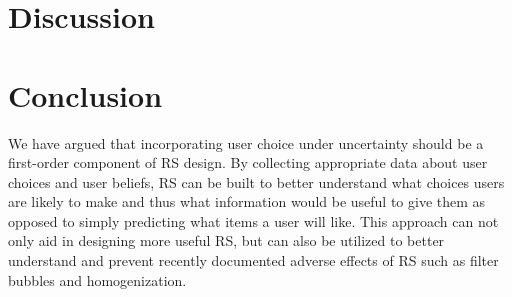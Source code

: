 \documentclass[sigconf]{acmart}
\begin{document}
\section{Discussion}

\section{Conclusion}

We have argued that incorporating user choice under uncertainty should be a first-order component of RS design. By collecting appropriate data about user choices and user beliefs, RS can be built to better understand what choices users are likely to make and thus what information would be useful to give them as opposed to simply predicting what items a user will like. This approach can not only aid in designing more useful RS, but can also be utilized to better understand and prevent recently documented adverse effects of RS such as filter bubbles and homogenization.



\end{document}
